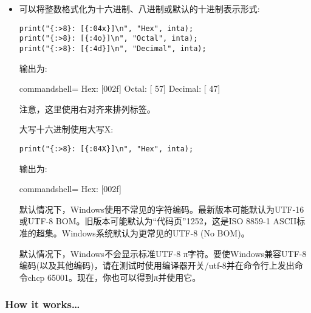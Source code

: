 \begin{itemize}
还可以将值居中:

\begin{lstlisting}[style=styleCXX]
print("inta is [{:^10}]\n", inta);
print("inta is [{:_^10}]\n", inta);
\end{lstlisting}

输出为:

\begin{tcblisting}{commandshell={}}
inta is [    47    ]
inta is [____47____]
\end{tcblisting}

\item 
可以将整数格式化为十六进制、八进制或默认的十进制表示形式:

\begin{lstlisting}[style=styleCXX]
print("{:>8}: [{:04x}]\n", "Hex", inta);
print("{:>8}: [{:4o}]\n", "Octal", inta);
print("{:>8}: [{:4d}]\n", "Decimal", inta);
\end{lstlisting}

输出为:

\begin{tcblisting}{commandshell={}}
    Hex: [002f]
  Octal: [  57]
Decimal: [  47]
\end{tcblisting}

注意，这里使用右对齐来排列标签。

大写十六进制使用大写X:

\begin{lstlisting}[style=styleCXX]
print("{:>8}: [{:04X}]\n", "Hex", inta);
\end{lstlisting}

输出为:

\begin{tcblisting}{commandshell={}}
    Hex: [002f]
\end{tcblisting}

\begin{tcolorbox}[colback=gray!5!white,colframe=gray!75!black,title=Tip]
默认情况下，Windows使用不常见的字符编码。最新版本可能默认为UTF-16或UTF-8 BOM。旧版本可能默认为“代码页”1252，这是ISO 8859-1 ASCII标准的超集。Windows系统默认为更常见的UTF-8 (No BOM)。

默认情况下，Windows不会显示标准UTF-8 π字符。要使Windows兼容UTF-8编码(以及其他编码)，请在测试时使用编译器开关/utf-8并在命令行上发出命令chcp 65001。现在，你也可以得到π并使用它。
\end{tcolorbox}
	
\end{itemize}

\subsubsection{How it works…}

